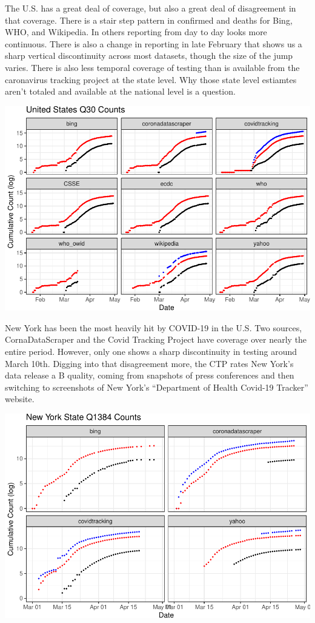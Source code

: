 \documentclass[
]{book}
\begin{document}
The U.S. has a great deal of coverage, but also a great deal of disagreement in that coverage. There is a stair step pattern in confirmed and deaths for Bing, WHO, and Wikipedia. In others reporting from day to day looks more continuous. There is also a change in reporting in late February that shows us a sharp vertical discontinuity across most datasets, though the size of the jump varies. There is also less temporal coverage of testing than is available from the caronavirus tracking project at the state level. Why those state level estiamtes aren't totaled and available at the national level is a question.

\begin{center}\includegraphics[width=1\linewidth]{HowToBeCarefulWithCovid19Counts_files/figure-latex/p_over_time_by_source_us1-1} \end{center}

New York has been the most heavily hit by COVID-19 in the U.S. Two sources, CornaDataScraper and the Covid Tracking Project have coverage over nearly the entire period. However, only one shows a sharp discontinuity in testing around March 10th. Digging into that disagreement more, the CTP rates New York's data release a B quality, coming from snapshots of press conferences and then switching to screenshots of New York's ``Department of Health Covid-19 Tracker'' website.

\begin{center}\includegraphics[width=1\linewidth]{HowToBeCarefulWithCovid19Counts_files/figure-latex/p_over_time_by_source_new_york_state1-1} \end{center}
\end{document}
